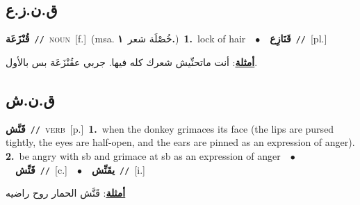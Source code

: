 \documentclass[10pt,a4paper,twoside]{article} %
\begin{document}
\begin{multicols}{2}
\vspace{-3mm}
\subsection*{\color{blue}\foreignlanguage{arabic}{ق.ن.ز.ع}\color{blue}{}} 

{\setlength\topsep{0pt}\textbf{\foreignlanguage{arabic}{قُنْزَعَة}}\ {\color{gray}\texttt{//}\color{black}}\ \textsc{noun}\ [f.]\ \color{gray}(msa. \foreignlanguage{arabic}{خُصْلَة شعر}~\foreignlanguage{arabic}{\textbf{١.}})\color{black}\ \textbf{1.}~lock of hair\ \ $\bullet$\ \ \setlength\topsep{0pt}\textbf{\foreignlanguage{arabic}{قَنَازِع}}\ {\color{gray}\texttt{//}\color{black}}\ [pl.]\  \begin{flushright}\color{gray}\foreignlanguage{arabic}{\textbf{\underline{\foreignlanguage{arabic}{أمثلة}}}: أنت ماتحنِّيش شعرك كله فيها. جربي عقُنْزَعَة بس بالأول.}\end{flushright}\color{black}} \vspace{2mm}

\vspace{-3mm}
\subsection*{\color{blue}\foreignlanguage{arabic}{ق.ن.ش}\color{blue}{}} 

{\setlength\topsep{0pt}\textbf{\foreignlanguage{arabic}{قَنَّش}}\ {\color{gray}\texttt{//}\color{black}}\ \textsc{verb}\ [p.]\ \textbf{1.}~when the donkey grimaces its face (the lips are pursed tightly, the eyes are half-open, and the ears are pinned as an expression of anger).  \textbf{2.}~be angry with sb and grimace at sb as an expression of anger\ \ $\bullet$\ \ \setlength\topsep{0pt}\textbf{\foreignlanguage{arabic}{قَنِّش}}\ {\color{gray}\texttt{//}\color{black}}\ [c.]\ \ $\bullet$\ \ \setlength\topsep{0pt}\textbf{\foreignlanguage{arabic}{يقَنِّش}}\ {\color{gray}\texttt{//}\color{black}}\ [i.]\  \begin{flushright}\color{gray}\foreignlanguage{arabic}{\textbf{\underline{\foreignlanguage{arabic}{أمثلة}}}: قَنَّش الحمار روح راضيه}\end{flushright}\color{black}} \vspace{2mm}


\end{multicols}
\end{document}
